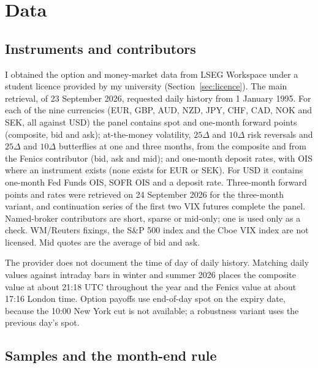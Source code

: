 \documentclass[11pt]{article}
\theoremstyle{result}
\newcommand{\D}{\Delta}
\begin{document}
\section{Data}\label{sec:data}

\subsection{Instruments and contributors}

I obtained the option and money-market data from LSEG Workspace under a student licence provided by my university (Section~\ref{sec:licence}). The main retrieval, of 23 September 2026, requested daily history from 1 January 1995. For each of the nine currencies (EUR, GBP, AUD, NZD, JPY, CHF, CAD, NOK and SEK, all against USD) the panel contains spot and one-month forward points (composite, bid and ask); at-the-money volatility, $25\D$ and $10\D$ risk reversals and $25\D$ and $10\D$ butterflies at one and three months, from the composite and from the Fenics contributor (bid, ask and mid); and one-month deposit rates, with OIS where an instrument exists (none exists for EUR or SEK). For USD it contains one-month Fed Funds OIS, SOFR OIS and a deposit rate. Three-month forward points and rates were retrieved on 24 September 2026 for the three-month variant, and continuation series of the first two VIX futures complete the panel. Named-broker contributors are short, sparse or mid-only; one is used only as a check. WM/Reuters fixings, the S\&P 500 index and the Cboe VIX index are not licensed. Mid quotes are the average of bid and ask.

The provider does not document the time of day of daily history. Matching daily values against intraday bars in winter and summer 2026 places the composite value at about 21:18 UTC throughout the year and the Fenics value at about 17:16 London time. Option payoffs use end-of-day spot on the expiry date, because the 10:00 New York cut is not available; a robustness variant uses the previous day's spot.

\subsection{Samples and the month-end rule}
\end{document}
